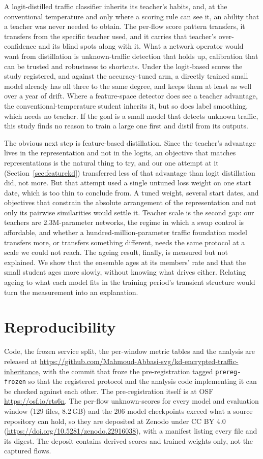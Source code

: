 \documentclass[journal]{IEEEtran}
\begin{document}
A logit-distilled traffic classifier inherits its teacher's habits, and, at the conventional temperature and only where a scoring rule can see it, an ability that a teacher was never needed to obtain. The per-flow score pattern transfers, it transfers from the specific teacher used, and it carries that teacher's over-confidence and its blind spots along with it. What a network operator would want from distillation is unknown-traffic detection that holds up, calibration that can be trusted and robustness to shortcuts. Under the logit-based scores the study registered, and against the accuracy-tuned arm, a directly trained small model already has all three to the same degree, and keeps them at least as well over a year of drift. Where a feature-space detector does see a teacher advantage, the conventional-temperature student inherits it, but so does label smoothing, which needs no teacher. If the goal is a small model that detects unknown traffic, this study finds no reason to train a large one first and distil from its outputs.

The obvious next step is feature-based distillation. Since the teacher's advantage lives in the representation and not in the logits, an objective that matches representations is the natural thing to try, and our one attempt at it (Section~\ref{sec:featurekd}) transferred less of that advantage than logit distillation did, not more. But that attempt used a single untuned loss weight on one start date, which is too thin to conclude from. A tuned weight, several start dates, and objectives that constrain the absolute arrangement of the representation and not only its pairwise similarities would settle it. Teacher scale is the second gap: our teachers are 2.3M-parameter networks, the regime in which a swap control is affordable, and whether a hundred-million-parameter traffic foundation model transfers more, or transfers something different, needs the same protocol at a scale we could not reach. The ageing result, finally, is measured but not explained. We show that the ensemble ages at its members' rate and that the small student ages more slowly, without knowing what drives either. Relating ageing to what each model fits in the training period's transient structure would turn the measurement into an explanation.

\section*{Reproducibility}
Code, the frozen service split, the per-window metric tables and the analysis are released at \url{https://github.com/Mahmoud-Abbasi-svg/kd-encrypted-traffic-inheritance}, with the commit that froze the pre-registration tagged \texttt{prereg-frozen} so that the registered protocol and the analysis code implementing it can be checked against each other. The pre-registration itself is at OSF \url{https://osf.io/rts6n}. The per-flow unknown-scores for every model and evaluation window (129 files, 8.2\,GB) and the 206 model checkpoints exceed what a source repository can hold, so they are deposited at Zenodo under CC BY 4.0 (\url{https://doi.org/10.5281/zenodo.22916038}), with a manifest listing every file and its digest. The deposit contains derived scores and trained weights only, not the captured flows.
\end{document}
